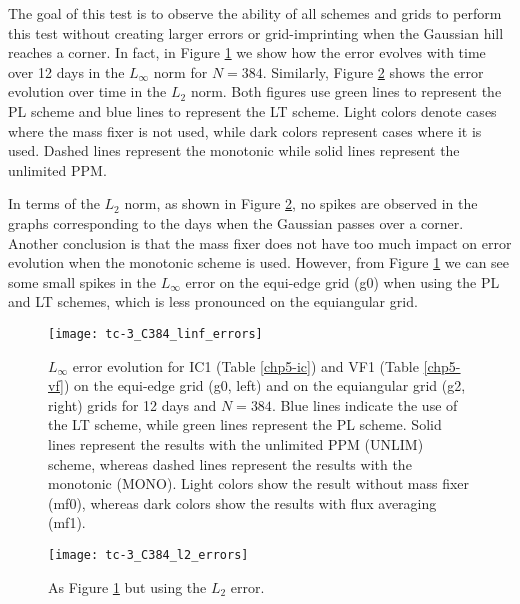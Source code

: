 The goal of this test is to observe the ability of all schemes and grids to perform this test without creating
larger errors or grid-imprinting when the Gaussian hill reaches a corner.
In fact, in Figure \ref{chp-advcs-sec-exp-adv2-evol-linf} we show how the error evolves with time over 12 days in the $L_{\infty}$ norm for $N=384$.
Similarly, Figure \ref{chp-advcs-sec-exp-adv2-evol-l2} shows the error evolution over time in the $L_2$ norm.
Both figures use green lines to represent the PL scheme and blue lines to represent the LT scheme.
Light colors denote cases where the mass fixer is not used, while dark colors represent cases where it is used. 
Dashed lines represent the monotonic while solid lines represent the unlimited PPM.

\newpage
In terms of the $L_2$ norm, as shown in Figure \ref{chp-advcs-sec-exp-adv2-evol-l2}, 
no spikes are observed in the graphs corresponding to the days when the Gaussian passes over a corner.
Another conclusion is that the mass fixer does not have too much impact on error evolution when the monotonic scheme is used.
However, from Figure \ref{chp-advcs-sec-exp-adv2-evol-linf} we can see some small spikes in the $L_{\infty}$ error
on the equi-edge grid (g0) when using the PL and LT schemes, which is less pronounced on the equiangular grid.
\begin{figure}[!htb]
	\centering
	\texttt{[image: tc-3\_C384\_linf\_errors]}
	\caption{
		$L_{\infty}$ error evolution for IC1 (Table \ref{chp5-ic}) and VF1 (Table \ref{chp5-vf}) 
		on the equi-edge grid (g0, left) and on the equiangular grid (g2, right) grids for 12 days and $N=384$.
		Blue lines indicate the use of the LT scheme, while green lines represent the PL scheme.
		Solid lines represent the results with the unlimited PPM (UNLIM) scheme, whereas dashed lines represent the results with the monotonic (MONO).
		Light colors show the result without mass fixer (mf0), whereas dark colors show the results with flux averaging (mf1).
		\label{chp-advcs-sec-exp-adv2-evol-linf}}
\end{figure}

\begin{figure}[!htb]
	\centering
	\texttt{[image: tc-3\_C384\_l2\_errors]}
	\caption{As Figure \ref{chp-advcs-sec-exp-adv2-evol-linf} but using the $L_2$ error.\label{chp-advcs-sec-exp-adv2-evol-l2}}
\end{figure}

